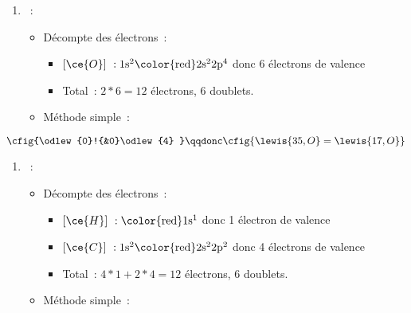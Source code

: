 \documentclass[a4paper, 12pt, final, garamond]{book}
\begin{document}
\begin{enumerate}
    \item[]
        \begin{itemize}[label=$\diamond$, leftmargin=10pt]
            ~:
                \begin{itemize}[label=$\triangleright$, leftmargin=20pt]
                    \item Décompte des électrons~:
                        \begin{itemize}[label=$\ra$, leftmargin=20pt]
                            \item $[\ce{O}]~: \rm 1s^2\color{red}2s^22p^4$
                                donc 6 électrons de valence
                            \item Total~: $2*6 = 12$ électrons, 6
                                doublets.
                        \end{itemize}
                    \item Méthode simple~:
                \end{itemize}
        \end{itemize}
\end{enumerate}
\[
    \cfig{%
        \odlew{0}!{&0}\odlew{4}
    }
    \qqdonc
    \cfig{\lewis{35,O}=\lewis{17,O}}
\]
\begin{enumerate}
    \item[]
        \begin{itemize}[label=$\diamond$, leftmargin=10pt]
            ~:
                \begin{itemize}[label=$\triangleright$, leftmargin=20pt]
                    \item Décompte des électrons~:
                        \begin{itemize}[label=$\ra$, leftmargin=20pt]
                            \item $[\ce{H}]~: \rm \color{red}1s^1$
                                donc 1 électron de valence
                            \item $[\ce{C}]~: \rm 1s^2\color{red}2s^22p^2$
                                donc 4 électrons de valence
                            \item Total~: $4*1 + 2*4 = 12$ électrons, 6
                                doublets.
                        \end{itemize}
                    \item Méthode simple~:
                \end{itemize}
        \end{itemize}
\end{enumerate}
\end{document}
